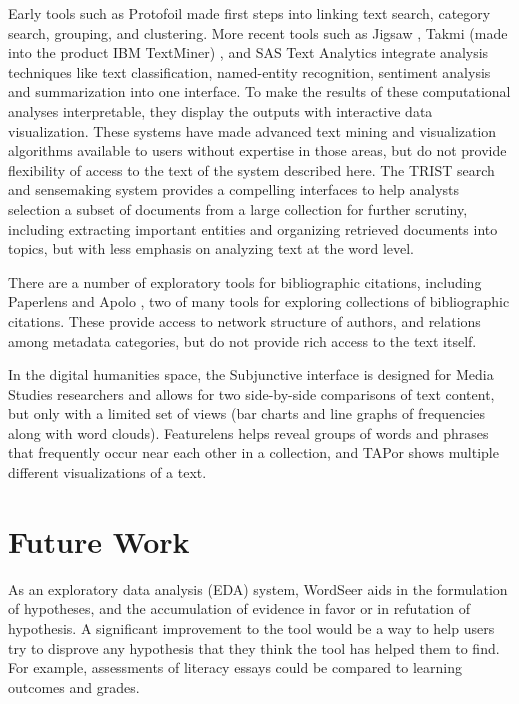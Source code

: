 \documentclass{sig-alternate}
\begin{document}
 Early tools such as Protofoil \cite{rao1994protofoil} made first steps into linking text search, category search, grouping, and clustering.  More recent tools such as Jigsaw \cite{gorg_combining_2012},  Takmi (made into the product IBM TextMiner) \cite{uramoto2004text}, and SAS Text Analytics integrate analysis techniques like text classification, named-entity recognition, sentiment analysis and summarization into one interface. 
 To make the results of these computational analyses interpretable, they display the outputs with interactive data visualization. These systems have made advanced text mining and visualization algorithms available to users without expertise in those areas, but do not provide flexibility of  access to the text of the system described here.   The TRIST search and sensemaking system \cite{jonker2005information} provides a compelling interfaces to help analysts selection a subset of documents from a large collection for further scrutiny, including extracting important entities and organizing retrieved documents into topics, but with less emphasis on analyzing text at the word level.

There are a number of exploratory tools for bibliographic citations, including Paperlens \cite{lee2005understanding} and Apolo \cite{chau2011apolo}, two  of many tools for exploring collections of bibliographic citations.  These provide access to network structure of authors, and relations among metadata categories, but do not provide rich access to the text itself.

In the digital humanities space, the Subjunctive interface \cite{bron2012subjunctive} is designed for Media Studies researchers and allows for two side-by-side comparisons of text content, but only with a limited set of views (bar charts and line graphs of frequencies along with word clouds). Featurelens \cite{don2007discovering} helps  reveal groups of words and phrases that frequently occur near each other in a collection, and
TAPor \cite{rockwell2003text} shows multiple different visualizations of a text.

\section{Future Work}
As an exploratory data analysis (EDA) system, WordSeer aids in the formulation of hypotheses, and the accumulation of evidence in favor or in refutation of hypothesis. A significant improvement to the tool would be a way to help users try to disprove any hypothesis that they think the tool has helped them to find. For example, assessments of literacy essays could be compared to learning outcomes and grades.
\end{document}
